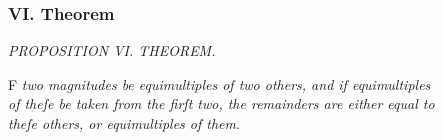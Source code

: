 \documentclass[11pt,preview]{standalone}
\begin{document}
\subsubsection{VI. Theorem}

\begin{minipage}{\textwidth}
    \begin{center}
        \textit{PROPOSITION VI. THEOREM.}\label{book5pr6} \\
    \end{center}

    \hfill

    \begin{center}
        \raggedright \lettrine[lines=3, loversize=1, nindent=0pt]{}{}F \textit{two magnitudes be equimultiples of two others, and if equimultiples\\ of theſe be taken from the firſt two, the remainders are either equal to\\ theſe others, or equimultiples of them}.
    \end{center}
\end{minipage}

\hfill

\hfill
\end{document}
